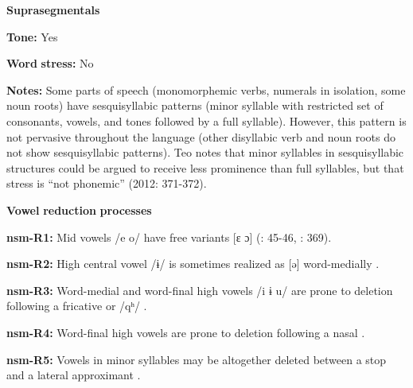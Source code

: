 \begin{styleBody}
\textbf{Suprasegmentals}
\end{styleBody}

\begin{styleBody}
\textbf{Tone:} Yes
\end{styleBody}

\begin{styleBody}
\textbf{Word} \textbf{stress:} No
\end{styleBody}

\begin{styleBody}
\textbf{Notes:} Some parts of speech (monomorphemic verbs, numerals in isolation, some noun roots) have sesquisyllabic patterns  (minor syllable with restricted set of consonants, vowels, and tones followed by a full syllable). However, this pattern is not pervasive throughout the language (other disyllabic verb and noun roots do not show sesquisyllabic patterns). Teo notes that minor syllables in sesquisyllabic structures could be argued to receive less prominence than full syllables, but that stress is “not phonemic” (2012: 371-372).
\end{styleBody}

\begin{styleBody}
\textbf{Vowel} \textbf{reduction} \textbf{processes}
\end{styleBody}

\begin{styleBody}
\textbf{nsm-R1:} Mid vowels /e o/ have free variants [ɛ ɔ] (\citealt{Teo2009}: 45-46, \citealt{Teo2012}: 369).
\end{styleBody}

\begin{styleBody}
\textbf{nsm-R2:} High central vowel /ɨ/ is sometimes realized as [ə] word-medially \citep[45]{Teo2009}.
\end{styleBody}

\begin{styleBody}
\textbf{nsm-R3:} Word-medial and word-final high vowels /i ɨ u/ are prone to deletion following a fricative or /qʰ/ \citep[66]{Teo2009}.
\end{styleBody}

\begin{styleBody}
\textbf{nsm-R4:} Word-final high vowels are prone to deletion following a nasal \citep[369]{Teo2012}.
\end{styleBody}

\begin{styleBody}
\textbf{nsm-R5:} Vowels in minor syllables may be altogether deleted between a stop and a lateral approximant \citep[370]{Teo2012}.
\end{styleBody}

